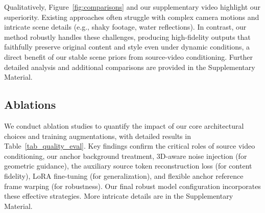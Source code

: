 Qualitatively, Figure~\ref{fig:comparisons} and our supplementary video highlight our superiority. Existing approaches often struggle with complex camera motions and intricate scene details (e.g., shaky footage, water reflections). In contrast, our method robustly handles these challenges, producing high-fidelity outputs that faithfully preserve original content and style even under dynamic conditions, a direct benefit of our stable scene priors from source-video conditioning. Further detailed analysis and additional comparisons are provided in the Supplementary Material.


\subsection{Ablations}
\label{sec:ablations}

We conduct ablation studies to quantify the impact of our core architectural choices and training augmentations, with detailed results in Table~\ref{tab_quality_eval}. Key findings confirm the critical roles of source video conditioning, our anchor background treatment, 3D-aware noise injection (for geometric guidance), the auxiliary source token reconstruction loss (for content fidelity), LoRA fine-tuning (for generalization), and flexible anchor reference frame warping (for robustness). Our final robust model configuration incorporates these effective strategies. More intricate details are in the Supplementary Material.